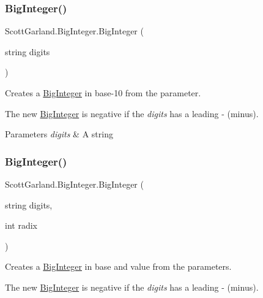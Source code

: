 \subsubsection{\texorpdfstring{Big\+Integer()}{BigInteger()}\hspace{0.1cm}{\footnotesize\ttfamily [7/8]}}
{\footnotesize\ttfamily Scott\+Garland.\+Big\+Integer.\+Big\+Integer (\begin{DoxyParamCaption}\item[{string}]{digits }\end{DoxyParamCaption})\hspace{0.3cm}{\ttfamily [inline]}}



Creates a \hyperlink{class_scott_garland_1_1_big_integer}{Big\+Integer} in base-\/10 from the parameter. 

The new \hyperlink{class_scott_garland_1_1_big_integer}{Big\+Integer} is negative if the {\itshape digits}  has a leading -\/ (minus). 


\begin{DoxyParams}{Parameters}
{\em digits} & A string\\
\hline
\end{DoxyParams}
\mbox{\label{class_scott_garland_1_1_big_integer_aa998ee8f5c1fc81395b3acdd695c82f5}} 
\subsubsection{\texorpdfstring{Big\+Integer()}{BigInteger()}\hspace{0.1cm}{\footnotesize\ttfamily [8/8]}}
{\footnotesize\ttfamily Scott\+Garland.\+Big\+Integer.\+Big\+Integer (\begin{DoxyParamCaption}\item[{string}]{digits,  }\item[{int}]{radix }\end{DoxyParamCaption})\hspace{0.3cm}{\ttfamily [inline]}}



Creates a \hyperlink{class_scott_garland_1_1_big_integer}{Big\+Integer} in base and value from the parameters. 

The new \hyperlink{class_scott_garland_1_1_big_integer}{Big\+Integer} is negative if the {\itshape digits}  has a leading -\/ (minus). 


